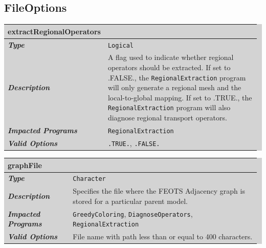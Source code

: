 \documentclass{softwaremanual}
\begin{document}
\subsection{FileOptions}\label{sec:FileOptions}
\noindent\begingroup\setlength{\fboxsep}{0pt}
\colorbox{lightgray}{
\begin{tabular}{p{0.25\linewidth} p{0.725\linewidth}}
\toprule
\textbf{extractRegionalOperators} & \\
\midrule
\textbf{\textit{Type}} & \texttt{Logical} \\
\midrule
\textbf{\textit{Description}} & A flag used to indicate whether regional operators should be extracted. If set to .FALSE., the \texttt{RegionalExtraction} program will only generate a regional mesh and the local-to-global mapping. If set to .TRUE., the \texttt{RegionalExtraction} program will also diagnose regional transport operators. \\
\midrule
\textbf{\textit{Impacted Programs}} & \texttt{RegionalExtraction} \\
\midrule
\textbf{\textit{Valid Options}}  & \texttt{.TRUE.}, \texttt{.FALSE.} \\
\bottomrule
\end{tabular}
}\endgroup


\noindent\begingroup\setlength{\fboxsep}{0pt}
\colorbox{lightgray}{
\begin{tabular}{p{0.25\linewidth} p{0.725\linewidth}}
\toprule
\textbf{graphFile} & \\
\midrule
\textbf{\textit{Type}} & \texttt{Character} \\
\midrule
\textbf{\textit{Description}} & Specifies the file where the FEOTS Adjacency graph is stored for a particular parent model.  \\
\midrule
\textbf{\textit{Impacted Programs}} & \texttt{GreedyColoring}, \texttt{DiagnoseOperators}, \texttt{RegionalExtraction} \\
\midrule
\textbf{\textit{Valid Options}}  & File name with path less than or equal to 400 characters. \\
\bottomrule
\end{tabular}
}\endgroup
\end{document}
